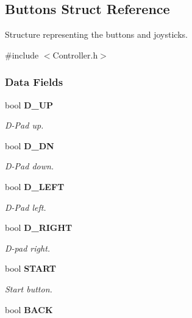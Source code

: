 \subsection{Buttons Struct Reference}
\label{struct_buttons}


Structure representing the buttons and joysticks.  




{\ttfamily \#include $<$Controller.\-h$>$}

\subsubsection*{Data Fields}
\begin{DoxyCompactItemize}
\item 
bool {\bf D\-\_\-\-U\-P}\label{struct_buttons_a5c0a188da90fd9f779b09139f2255290}

\begin{DoxyCompactList}\small\item\em D-\/\-Pad up. \end{DoxyCompactList}\item 
bool {\bf D\-\_\-\-D\-N}\label{struct_buttons_a8b7fdb4bf84a17bfb298945e1d76b81b}

\begin{DoxyCompactList}\small\item\em D-\/\-Pad down. \end{DoxyCompactList}\item 
bool {\bf D\-\_\-\-L\-E\-F\-T}\label{struct_buttons_adfe927f5dd4989b3e6086d63a0698dc3}

\begin{DoxyCompactList}\small\item\em D-\/\-Pad left. \end{DoxyCompactList}\item 
bool {\bf D\-\_\-\-R\-I\-G\-H\-T}\label{struct_buttons_a787f4350c7b6d6f8e265d85c40bbaee9}

\begin{DoxyCompactList}\small\item\em D-\/pad right. \end{DoxyCompactList}\item 
bool {\bf S\-T\-A\-R\-T}\label{struct_buttons_a991094a2cc72be82f14668a78f8c2cc6}

\begin{DoxyCompactList}\small\item\em Start button. \end{DoxyCompactList}\item 
bool {\bf B\-A\-C\-K}\label{struct_buttons_aa617d468aa600e2db0ace404b6d73362}


\end{DoxyCompactItemize}
